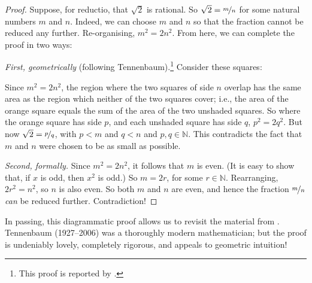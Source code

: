 \documentclass[10pt,a4paper]{article}
\makeatletter
\theoremstyle{plain}
\theoremstyle{definition}
\theoremstyle{remark}
\newcommand{\olref}{\@ifnextchar[{\olref@i}{\olref@final}}
\def\olref@i[#1]{\@ifnextchar[{\olref@ii}{\olref@final}}
\def\olref@ii[#1]{\@ifnextchar[{\olref@iii}{\olref@final}}
\def\olref@iii[#1]{\olref@final}
\def\olref@final#1{\ref{#1}}
\providecommand{\Nat}{\ensuremath{\mathbb{N}}}
\makeatother
\begin{document}
\begin{proof}
Suppose, for reductio, that $\sqrt{2}$ is rational. So $\sqrt{2} =
\nicefrac{m}{n}$ for some natural numbers $m$ and $n$. Indeed, we can
choose $m$ and $n$ so that the fraction cannot be reduced any further.
Re-organising, $m^{2} = 2n^{2}$. From here, we can complete the proof
in two ways:

\emph{First, geometrically} (following Tennenbaum).\footnote{This
proof is reported by \cite{Conway2006}.} Consider these squares:
\begin{center}	
\end{center}
Since $m^2 = 2n^2$, the region where the two squares of side $n$
overlap has the same area as the region which neither of the two
squares cover; i.e., the area of the orange square equals the sum of
the area of the two unshaded squares. So where the orange square has
side $p$, and each unshaded square has side $q$, $p^2 = 2q^2$. But now
$\sqrt{2} = \nicefrac{p}{q}$, with $p < m$ and $q < n$ and $p, q \in
\Nat$. This contradicts the fact that $m$ and $n$ were chosen to be as
small as possible.
		
\emph{Second, formally.} Since $m^{2} = 2n^{2}$, it follows that $m$
is even. (It is easy to show that, if $x$ is odd, then $x^2$ is odd.)
So $m = 2r$, for some $r \in \Nat$. Rearranging, $2r^2 = n^2$, 
so $n$ is also even. So both $m$ and $n$ are even, and hence the
fraction $\nicefrac{m}{n}$ \emph{can} be reduced further.
Contradiction!
\end{proof}

In passing, this diagrammatic proof allows us to revisit the material from \olref[his][set][mythology]{sec}. Tennenbaum (1927--2006) was a thoroughly modern mathematician; but the proof is undeniably lovely, completely rigorous, and appeals to geometric intuition!
\end{document}
